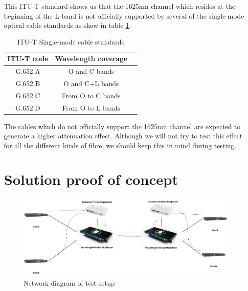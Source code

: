 \documentclass{article}
\begin{document}
This ITU-T standard shows us that the 1625nm channel which resides at the beginning of the L-band is not officially supported by several of the single-mode optical cable standards as show in table \ref{tab:single-mode_types}.

\begin{table}[h]
\centering
\label{tab:single-mode_types}
\caption{ITU-T Single-mode cable standards}
\begin{tabular}{|c|c|c|}
\hline 
ITU-T code & Wavelength coverage\\ 
\hline 
G.652.A & O and C bands \\ 
\hline
G.652.B & O and C+L bands \\
\hline
G.652.C & From O to C bands \\
\hline
G.652.D & From O to L bands \\
\hline
\end{tabular} 
\end{table}

The cables which do not officially support the 1625nm channel are expected to generate a higher attenuation effect. Although we will not try to test this effect for all the different kinds of fibre, we should keep this in mind during testing.

\newpage
\section{Solution proof of concept}
\begin{figure}
\centerline{\includegraphics[scale=0.4]{images/rp1-monitoring-links.png}}
\caption{Network diagram of test setup}
\end{figure}
\end{document}
